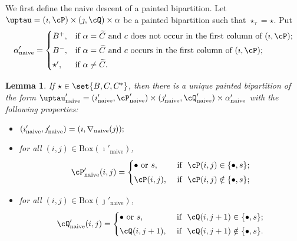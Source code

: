 \documentclass[12pt,a4paper]{amsart}
\def\DD{\nabla}
\numberwithin{equation}{section}
\newtheorem{lem}[thm]{Lemma}
\theoremstyle{remark}
\def\DD{\nabla}
\def\BOX#1{\mathrm{Box}(#1)}
\def\tnaive{\mathrm{naive}}
\def\cPpn{\cP'_\mathrm{naive}}
\def\cQpn{\cQ'_\mathrm{naive}}
\def\uptaupn{\uptau'_{\tnaive}}
\def\alphapn{\alpha'_{\tnaive}}
\def\imathpn{\imath'_{\tnaive}}
\def\jmathpn{\jmath'_{\tnaive}}
\def\DD{\nabla}
\begin{document}
We first define the naive descent of a painted bipartition. Let $\uptau=(\imath,\cP)\times (\jmath,\cQ)\times \alpha$ be a painted bipartition such that $\star_\tau=\star$. Put
  \begin{equation} \label{eq:def.alphap}
    \alphapn=\begin{cases} B^+,
  & \textrm{if $\alpha=\widetilde{C}$ and $c$ does not occur in the first column of $(\imath,\cP)$}; \smallskip \\
  B^-,
  & \textrm{if $\alpha=\widetilde{C}$ and  $c$ occurs in the first column of $(\imath,\cP)$}; \smallskip \\
  \star', & \textrm{if $\alpha\neq \widetilde C$}.
  \end{cases}
  \end{equation}

\begin{lem}\label{lemDDn1}
  If $\star \in \set{B,C,C^*}$, then there is a unique painted bipartition of the form $\uptaupn= (\imathpn,\cPpn)\times (\jmathpn,\cQpn)\times \alphapn$ with the following properties:
  \begin{itemize}
        \item $
   (\imathpn,\jmathpn)= (\imath,\DD_\mathrm{naive}(\jmath)); \smallskip
   $
   \item for all $(i,j)\in \BOX{\imathpn}$,
   \[
     \cPpn(i,j)=\begin{cases}
    \bullet \textrm{ or } s,&\textrm{ if  $\ \cP(i,j)\in \{\bullet, s\}$;} \smallskip \\
  \cP(i,j),& \textrm{ if $\ \cP(i,j)\notin \{\bullet, s\}$};\end{cases}
   \]
   \item for all $(i,j)\in \BOX{\jmathpn}$,
   \[
     \cQpn(i,j)=\begin{cases}
    \bullet \textrm{ or } s,&\textrm{ if  $\ \cQ(i,j+1)\in \{\bullet, s\}$;} \smallskip \\
  \cQ(i,j+1), & \textrm{ if $\ \cQ(i,j+1)\notin \{\bullet, s\}$}.  \end{cases}
   \]
    \end{itemize}
    \end{lem}
\end{document}
